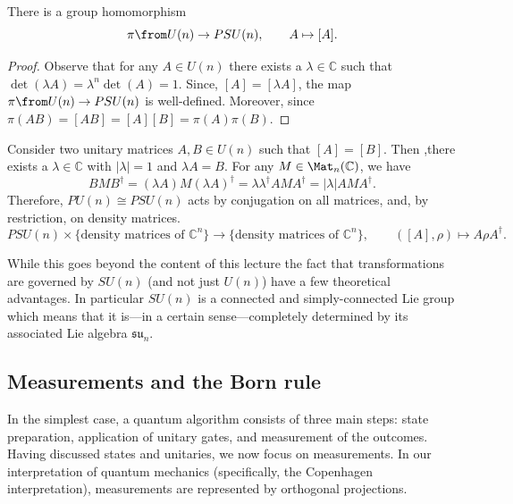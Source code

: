 \documentclass[a4paper,oneside, 12pt]{amsart}
\begin{document}
\begin{lemma}\label{lem:grp-homomorphism}
  There is a group homomorphism
  \begin{equation*}
    \pi \from U(n) \to PSU(n), \qquad A \mapsto [A].
  \end{equation*}
\end{lemma}
\begin{proof}
 Observe that for any \(A \in U(n)\) there exists a \(\lambda\in \mathbb{C}\) such that \(\det(\lambda A)= \lambda^{n} \det(A) = 1\).
 Since, \([A] = [\lambda A]\), the map \(\pi\from U(n) \to PSU(n)\) is well-defined.
 Moreover, since \(\pi(AB) = [AB] = [A][B] = \pi(A) \pi(B)\).
\end{proof}

\begin{example}\label{ex:group-action-factor-through}
  Consider two unitary matrices \(A, B \in U(n)\) such that \([A] = [B]\).
  Then ,there exists a \(\lambda \in \mathbb{C}\) with \(|\lambda | = 1\) and \(\lambda A = B\).
  For any \(M \in \Mat_{n}( \mathbb{C})\), we have
  \begin{equation*}
    BMB^{\dagger} = (\lambda A) M (\lambda A)^{\dagger} = \lambda \lambda^{\dagger} AMA^{\dagger} = |\lambda| AMA^{\dagger}.
  \end{equation*}
  Therefore, \(PU(n) \cong PSU(n)\) acts by conjugation on all matrices, and, by restriction, on density matrices.
  \begin{equation*}
    PSU(n) \times\{\text{density matrices of } \mathbb{C}^{n}\} \to\{\text{density matrices of } \mathbb{C}^{n}\},\qquad
    ([A], \rho) \mapsto A\rho A^{\dagger}.
  \end{equation*}
\end{example}

While this goes beyond the content of this lecture the fact that transformations are governed by \(SU(n)\) (and not just \(U(n)\)) have a few theoretical advantages.
In particular \(SU(n)\) is a connected and simply-connected Lie group which means that it is---in a certain sense---completely determined by its associated Lie algebra \(\mathfrak{su}_{n}\).

\subsection{Measurements and the Born rule}\label{sec:measurements-and-the-born-rule}
In the simplest case, a quantum algorithm consists of three main steps: state preparation, application of unitary gates, and measurement of the outcomes. Having discussed states and unitaries, we now focus on measurements.
In our interpretation of quantum mechanics (specifically, the Copenhagen interpretation), measurements are represented by orthogonal projections.
\end{document}
